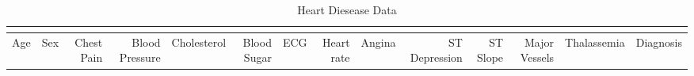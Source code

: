 \documentclass[times]{article}
\begin{document}
   \begin{landscape}
      \scriptsize
      \begin{longtable}{|rrrrrrrrrrrrrr|}
         \caption{Heart Diesease Data} \\
         \label{tab:raw_data} \\
         \hline
         Age & Sex & Chest Pain & Blood Pressure & Cholesterol & Blood Sugar & 
            ECG & Heart rate & Angina & ST Depression & ST Slope & Major Vessels 
            & Thalassemia & Diagnosis \\
         \endhead
         \hline
         
      \end{longtable}
   \end{landscape}
\end{document}
